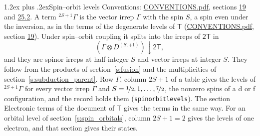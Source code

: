 \documentclass[10pt,a4paper]{article}
\makeatletter
\renewcommand\section{\@startsection{section}{1}{\z@}{-3ex plus -1ex minus -.2ex}%
  {1.2ex plus .2ex}{\normalfont\large\sffamily\bfseries\color{parttitle}}}
\numberwithin{equation}{section}
\newcommand{\grp}[1]{\mathsf{#1}}
\newcommand{\restr}[2]{#1\!\downarrow#2}
\newcommand{\irrJp}[2]{D^{(#1,#2)}}
\newcommand{\irrprod}{\otimes}
\newcommand{\term}[2]{{}^{#1}#2}
\makeatother
\begin{document}
\section{Spin--orbit levels}\label{s:spin_orbit}
Conventions: \href{../../CONVENTIONS.pdf}{CONVENTIONS.pdf}, sections \href{../../../rotation/CONVENTIONS.pdf\#conv.19}{19} and \href{../../CONVENTIONS.pdf\#conv.25.2}{25.2}.
\leavevmode\label{n:local.spin}\label{n:symbol.term}A term $\term{2S+1}{\Gamma}$ is the vector irrep $\Gamma$ with the spin $S$, a spin even under the inversion, as in the terms of the degenerate levels of \href{../../../rotation/data/pdf/T.pdf}{$\grp{T}$} (\href{../../CONVENTIONS.pdf}{CONVENTIONS.pdf}, section \href{../../../rotation/CONVENTIONS.pdf\#conv.19}{19}). Under spin--orbit coupling it splits into the irreps of $\grp{2T}$ in
\begin{equation}\label{e:spinorbit}\restr{(\Gamma \irrprod \irrJp{S}{+1})}{\grp{2T}},\end{equation}
and they are spinor irreps at half-integer $S$ and vector irreps at integer $S$. They follow from the products of section~\ref{s:fusion} and the multiplicities of section~\ref{s:subduction_parent}. Row $\Gamma$, column $2S + 1$ of a table gives the levels of $\term{2S+1}{\Gamma}$ for every vector irrep $\Gamma$ and $S = \nicefrac{1}{2}, 1, \dots, \nicefrac{7}{2}$, the nonzero spins of a d or f configuration, and the record holds them (\texttt{spinorbitlevels}). The section Electronic terms of the document of \href{../../../rotation/data/pdf/T.pdf}{$\grp{T}$} gives the terms in the same way. For an orbital level of section~\ref{s:spin_orbitals}, column $2S + 1 = 2$ gives the levels of one electron, and that section gives their states.
\end{document}
